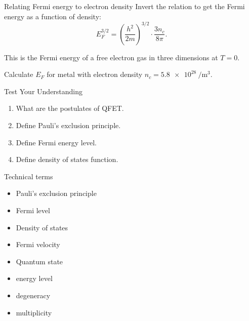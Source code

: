 \begin{frame}[label=pre-M2T1-slot1]{Relating Fermi energy to electron density}
	Invert the relation to get the Fermi energy as a function of density:
	\[
				E_F^{3/2} = \left(\frac{h^2}{2m}\right)^{3/2}\cdot \frac{3n_c}{8\pi}.
	\]
	\begin{center}
	\end{center}

	This is the Fermi energy of a free electron gas in three dimensions at $T=0$.
	\begin{problem}
		Calculate \(E_F\) for metal with electron density \(n_c = \SI{5.8e28}{\per\metre\cubed}\).
	\end{problem}
\end{frame}
%
\begin{frame}[label=pre-M2T1-slot1]{Test Your Understanding}
	\begin{enumerate}
		\item What are the postulates of QFET.
		\item Define Pauli's exclusion principle.
		\item Define Fermi energy level.
		\item Define density of states function.
	\end{enumerate}
\end{frame}
%
\begin{frame}[label=pre-M2T1-slot1]{Technical terms}
	\begin{itemize}
		\item Pauli's exclusion principle
		\item Fermi level
		\item Density of states
		\item Fermi velocity
		\item Quantum state
		\item energy level
		\item degeneracy
		\item multiplicity
	\end{itemize}
\end{frame}